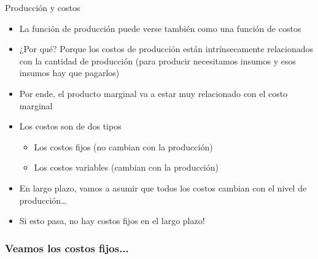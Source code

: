 \documentclass{beamer}
\begin{document}
\begin{frame}{Producción y costos}
\begin{itemize}
    \item La función de producción puede verse también como una función de costos
    \item ¿Por qué? Porque los costos de producción están intrínsecamente relacionados con la cantidad de producción (para producir necesitamos insumos y esos insumos hay que pagarlos)
    \item Por ende, el producto marginal va a estar muy relacionado con el costo marginal
    \item Los costos son de dos tipos
    \begin{itemize} 
        \item Los costos fijos (no cambian con la producción)
        \item Los costos variables (cambian con la producción)
    \end{itemize}
    \item En largo plazo, vamos a asumir que todos los costos cambian con el nivel de producción\dots
    \item Si esto pasa, no hay costos fijos en el largo plazo!
\end{itemize}
\end{frame}


\begin{frame}
\frametitle{Veamos los costos fijos...}
\begin{center}
\end{center}
\end{frame}
\end{document}
